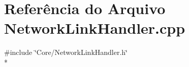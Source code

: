\section{Referência do Arquivo Network\+Link\+Handler.\+cpp}
\label{_network_link_handler_8cpp}
{\ttfamily \#include \char`\"{}Core/\+Network\+Link\+Handler.\+h\char`\"{}}\\*
